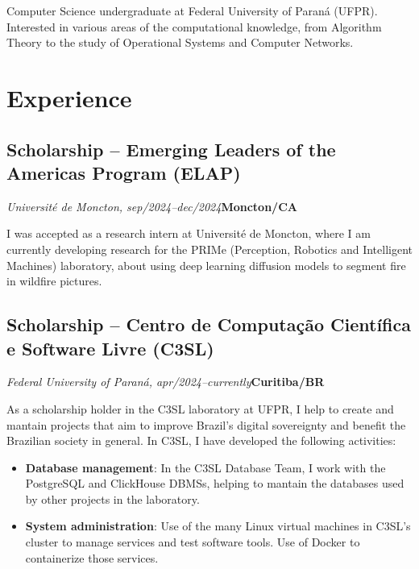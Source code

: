\documentclass[a4paper, 12pt]{moderncv}
\begin{document}
\makecvtitle

\small{Computer Science undergraduate at Federal University of Paraná (UFPR).
Interested in various areas of the computational knowledge, from Algorithm
Theory to the study of Operational Systems and Computer Networks.}

\section{Experience}
\vspace{1pt}
\subsection{\small{Scholarship -- Emerging Leaders of the Americas Program (ELAP)}}
\textit{Université de Moncton, sep/2024--dec/2024}\hspace{190pt}\textbf{Moncton/CA}

\vspace{3pt}
I was accepted as a research intern at Université de Moncton, where I am currently developing research for the PRIMe (Perception, Robotics and Intelligent Machines) laboratory, about using deep learning diffusion models to segment fire in wildfire pictures.
\vspace{4pt}

\subsection{\small{Scholarship -- Centro de Computação Científica e Software Livre (C3SL)}}
\textit{Federal University of Paraná, apr/2024--currently}\hspace{175pt}\textbf{Curitiba/BR}

\vspace{3pt}
As a scholarship holder in the C3SL laboratory at UFPR, I help to create and mantain projects that aim to improve Brazil's digital sovereignty and benefit the Brazilian society in general. In C3SL, I have developed the following activities:
\vspace{4pt}
\begin{itemize}
    \item{\textbf{Database management}: In the C3SL Database Team, I work with the PostgreSQL and ClickHouse DBMSs, helping to mantain the databases used by other projects in the laboratory.}
    \item{\textbf{System administration}: Use of the many Linux virtual machines in C3SL's cluster to manage services and test software tools. Use of Docker to containerize those services.}
\end{itemize}
\vspace{4pt}
\end{document}
